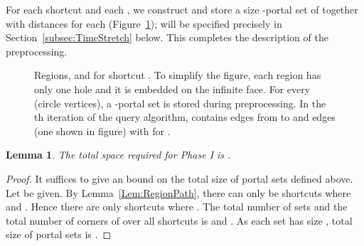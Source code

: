 \documentclass[11pt]{article}
\newtheorem{lemma}{Lemma}
\begin{document}
For each shortcut  and each , we construct and store a size  -portal set  of  together with distances  for each  (Figure~\ref{fig:PhaseIData});  will be specified precisely in Section~\ref{subsec:TimeStretch} below. This completes the description of the preprocessing.
\begin{figure}\centerline{}
\caption{Regions,  and  for shortcut . To simplify the figure, each region has only one hole and it is embedded on the infinite face. For every  (circle vertices), a -portal set  is stored during preprocessing. In the th iteration of the query algorithm,  contains edges from  to  and edges  (one shown in figure) with  for .}
\label{fig:PhaseIData}
\end{figure}
\begin{lemma}\label{Lem:TypeIPortalSet}
The total space required for Phase I is .
\end{lemma}
\begin{proof}
It suffices to give an  bound on the total size of portal sets defined above. Let  be given. By Lemma~\ref{Lem:RegionPath}, there can only be  shortcuts  where  and . Hence there are only  shortcuts  where . The total number of sets  and the total number of corners of  over all shortcuts  is  and . As each set  has size , total size of portal sets is .
\end{proof}
\end{document}
